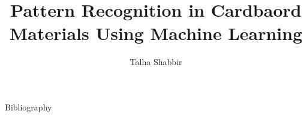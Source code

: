 \documentclass{styles/tthesis}
\title{Pattern Recognition in Cardbaord Materials Using Machine Learning}
\author{Talha Shabbir}
\begin{document}
	
	\printfrontpage
	
	
	
	
	\thispagestyle{empty}
	\mbox{}
	\newpage
	
	
	
	\thispagestyle{empty}
	\mbox{}
	\newpage
	
\tableofcontents
\listoffigures

\mainmatter










Bibliography

%
%
\end{document}
